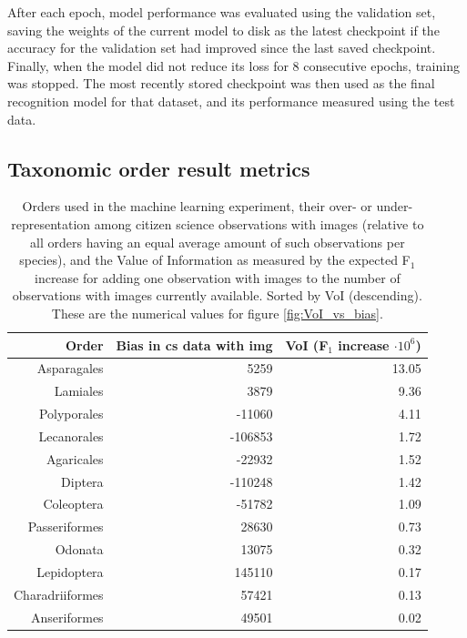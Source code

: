 \documentclass{article}
\begin{document}
After each epoch, model performance was evaluated using the validation set, saving the weights of the current model to disk as the latest checkpoint if the accuracy for the validation set had improved since the last saved checkpoint. Finally, when the model did not reduce its loss for 8 consecutive epochs, training was stopped. The most recently stored checkpoint was then used as the final recognition model for that dataset, and its performance measured using the test data.


\pagebreak
\subsection*{Taxonomic order result metrics}


\begin{table}[h!]
  \centering

  \begin{tabular}{|r | r | r|}
   \hline
   \textbf{Order} & \textbf{Bias in cs data with img} & \textbf{VoI (F\boldmath$_1$ increase \boldmath$\cdot10^{6}$)} \\ [0.5ex]
   \hline
   Asparagales & 5259 & 13.05 \\
   Lamiales & 3879 & 9.36 \\
   Polyporales & -11060 & 4.11 \\
   Lecanorales & -106853 & 1.72 \\
   Agaricales & -22932 & 1.52 \\
   Diptera & -110248 & 1.42 \\
   Coleoptera & -51782 & 1.09 \\
   Passeriformes & 28630 & 0.73 \\
   Odonata & 13075 & 0.32 \\
   Lepidoptera & 145110 & 0.17 \\
   Charadriiformes & 57421 & 0.13 \\
   Anseriformes & 49501 & 0.02 \\  [1ex]
   \hline
  \end{tabular}
  \caption{\footnotesize Orders used in the machine learning experiment, their over- or under-representation among citizen science observations with images (relative to all orders having an equal average amount of such observations per species), and the Value of Information as measured by the expected F\(_1\) increase for adding one observation with images to the number of observations with images currently available. Sorted by VoI (descending). These are the numerical values for figure \ref{fig:VoI_vs_bias}.}
  \label{tab:biases}
  \end{table}
\end{document}
